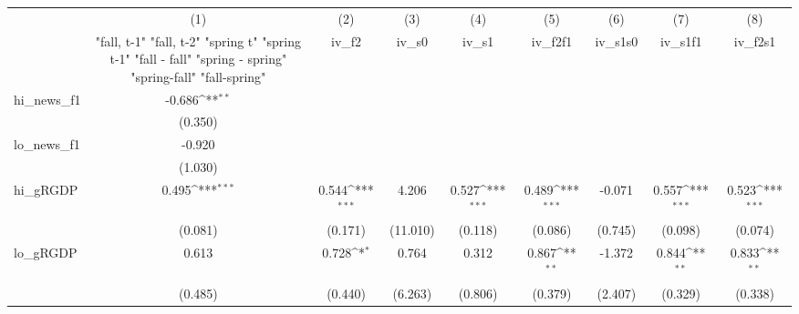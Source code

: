 {
\def\sym#1{\ifmmode^{#1}\else\(^{#1}\)\fi}
\begin{tabular}{l*{8}{c}}
\toprule
            &\multicolumn{1}{c}{(1)}&\multicolumn{1}{c}{(2)}&\multicolumn{1}{c}{(3)}&\multicolumn{1}{c}{(4)}&\multicolumn{1}{c}{(5)}&\multicolumn{1}{c}{(6)}&\multicolumn{1}{c}{(7)}&\multicolumn{1}{c}{(8)}\\
            &\multicolumn{1}{c}{  "fall, t-1" "fall, t-2" "spring t" "spring t-1"  "fall - fall" "spring - spring" "spring-fall" "fall-spring" }&\multicolumn{1}{c}{iv\_f2}&\multicolumn{1}{c}{iv\_s0}&\multicolumn{1}{c}{iv\_s1}&\multicolumn{1}{c}{iv\_f2f1}&\multicolumn{1}{c}{iv\_s1s0}&\multicolumn{1}{c}{iv\_s1f1}&\multicolumn{1}{c}{iv\_f2s1}\\
\midrule
hi\_news\_f1  &      -0.686\sym{**} &                     &                     &                     &                     &                     &                     &                     \\
            &     (0.350)         &                     &                     &                     &                     &                     &                     &                     \\
\addlinespace
lo\_news\_f1  &      -0.920         &                     &                     &                     &                     &                     &                     &                     \\
            &     (1.030)         &                     &                     &                     &                     &                     &                     &                     \\
\addlinespace
hi\_gRGDP    &       0.495\sym{***}&       0.544\sym{***}&       4.206         &       0.527\sym{***}&       0.489\sym{***}&      -0.071         &       0.557\sym{***}&       0.523\sym{***}\\
            &     (0.081)         &     (0.171)         &    (11.010)         &     (0.118)         &     (0.086)         &     (0.745)         &     (0.098)         &     (0.074)         \\
\addlinespace
lo\_gRGDP    &       0.613         &       0.728\sym{*}  &       0.764         &       0.312         &       0.867\sym{**} &      -1.372         &       0.844\sym{**} &       0.833\sym{**} \\
            &     (0.485)         &     (0.440)         &     (6.263)         &     (0.806)         &     (0.379)         &     (2.407)         &     (0.329)         &     (0.338)         \\

\end{tabular}}
